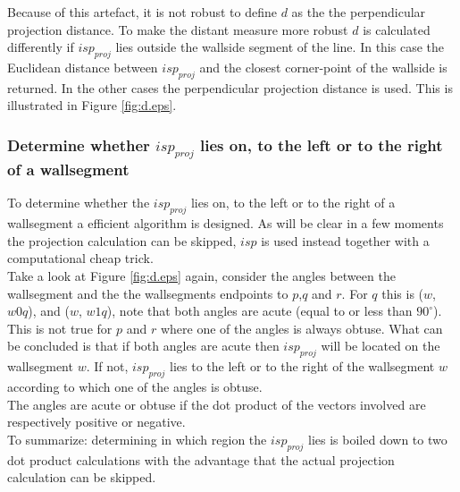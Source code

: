 \documentclass[10pt]{article}
\begin{document}
Because of this artefact, it is not robust to define $d$ as the the perpendicular
projection distance.  To make the distant measure more robust $d$ is calculated
differently if $isp_{proj}$ lies outside the wallside segment of the line. In
this case the Euclidean distance between $isp_{proj}$ and the closest
corner-point of the wallside is returned. In the other cases the perpendicular
projection distance is used. This is illustrated in Figure
\ref{fig:d.eps}.




\subsubsection{Determine whether $isp_{proj}$ lies on, to the left or to the
right of a wallsegment}
To determine whether the $isp_{proj}$ lies on, to the left or to the right of a
wallsegment a efficient algorithm is designed. As will be clear in a few moments
the projection calculation can be skipped, $isp$ is used instead together with a
computational cheap trick.\\

Take a look at Figure \ref{fig:d.eps} again, consider the angles between the wallsegment and the
the wallsegments endpoints to $p$,$q$ and $r$.
For $q$ this is ($w$, $w0 q$), and ($w$, $w1 q$), note that both angles are acute (equal to or less than
$90^{\circ}$).
This is not true for $p$ and $r$ where one of the angles is always obtuse.
What can be concluded is that if both angles are acute then $isp_{proj}$ will be located on the wallsegment $w$. If not,
$isp_{proj}$ lies to the left or to the right of the wallsegment $w$ according to
which one of the angles is obtuse.\\
The angles are acute or obtuse if the dot product of the vectors involved are
respectively positive or negative.\\
To summarize: determining in which region the $isp_{proj}$ lies is boiled down to
two dot product calculations with the advantage that the actual projection
calculation can be skipped.
\end{document}
